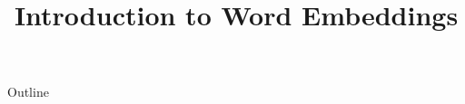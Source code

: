 \documentclass[xcolor=dvipsnames,compress,t,pdf,9pt]{beamer}
\title[\insertframenumber /\inserttotalframenumber]{Introduction to Word Embeddings}
\begin{document}
	\begin{frame}
	\titlepage
	\end{frame}
	
	\begin{frame}{Outline}
	    \tableofcontents
	\end{frame}

	
	
	
\end{document}
